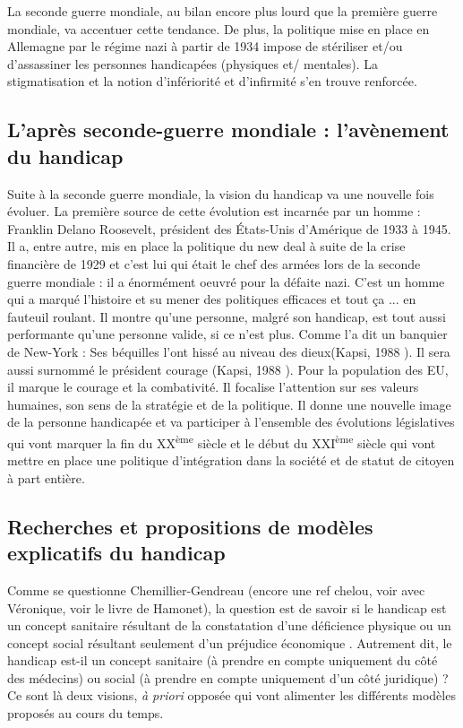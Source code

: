 La seconde guerre mondiale, au bilan encore plus lourd que la première guerre mondiale, va accentuer cette tendance. De plus, la politique  mise en place en Allemagne par le régime nazi à partir de 1934 impose de stériliser et/ou d'assassiner les personnes handicapées (physiques et/ mentales). La stigmatisation et la notion d'infériorité et d'infirmité s'en trouve renforcée.


\subsection{L'après seconde-guerre mondiale : l'avènement du handicap}
Suite à la seconde guerre mondiale, la vision du handicap va une nouvelle fois évoluer.
La première source de cette évolution est incarnée par un homme : Franklin Delano Roosevelt, président des États-Unis d'Amérique de 1933 à 1945. Il a, entre autre, mis en place la politique du new deal à suite de la crise financière de 1929 et c'est lui qui était le chef des armées lors de la seconde guerre mondiale : il a énormément oeuvré pour la défaite nazi. C'est un homme qui a marqué l'histoire et su mener des politiques efficaces et tout ça ... en fauteuil roulant. Il montre qu'une personne, malgré son handicap, est tout aussi performante qu'une personne valide, si ce n'est plus. Comme l'a dit un banquier de New-York : \og Ses béquilles l'ont hissé au niveau des dieux\fg (Kapsi, 1988 \cite{Kapsi1988}). Il sera aussi surnommé \og le président courage \fg (Kapsi, 1988 \cite{Kapsi1988}). Pour la population des EU, il marque le courage et la combativité. Il focalise l’attention sur ses valeurs humaines, son sens de la stratégie et de la politique. Il donne une nouvelle image de la personne handicapée et va participer à l'ensemble des évolutions législatives qui vont marquer la fin du XX\textsuperscript{ème} siècle et le début du XXI\textsuperscript{ème} siècle qui vont mettre en place une politique d'intégration dans la société et de statut de citoyen à part entière.

\subsection{Recherches et propositions de modèles explicatifs du handicap}

Comme se questionne Chemillier-Gendreau (encore une ref chelou, voir avec Véronique, voir le livre de Hamonet), \og la question est de savoir si le handicap est un concept sanitaire résultant de la constatation d'une déficience physique ou un concept social résultant seulement d'un préjudice économique \fg{}. Autrement dit, le handicap est-il un concept sanitaire (à prendre en compte uniquement du côté des médecins) ou social (à prendre en compte uniquement d'un côté juridique) ? Ce sont là deux visions, \textit{à priori} opposée qui vont alimenter les différents modèles proposés au cours du temps.

